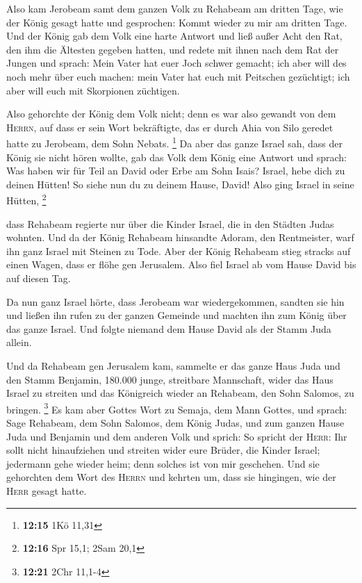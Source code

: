  Also kam Jerobeam samt dem ganzen Volk zu Rehabeam am
dritten Tage, wie der König gesagt hatte und gesprochen: Kommt wieder zu
mir am dritten Tage.  Und der König gab dem Volk eine
harte Antwort und ließ außer Acht den Rat, den ihm die Ältesten gegeben
hatten,  und redete mit ihnen nach dem Rat der Jungen und
sprach: Mein Vater hat euer Joch schwer gemacht; ich aber will des noch
mehr über euch machen: mein Vater hat euch mit Peitschen gezüchtigt; ich
aber will euch mit Skorpionen züchtigen.

 Also gehorchte der König dem Volk nicht; denn es war
also gewandt von dem \textsc{Herrn}, auf dass er sein Wort bekräftigte,
das er durch Ahia von Silo geredet hatte zu Jerobeam, dem Sohn Nebats.
\footnote{\textbf{12:15} 1Kö 11,31}  Da aber das ganze
Israel sah, dass der König sie nicht hören wollte, gab das Volk dem
König eine Antwort und sprach: Was haben wir für Teil an David oder Erbe
am Sohn Isais? Israel, hebe dich zu deinen Hütten! So siehe nun du zu
deinem Hause, David! Also ging Israel in seine Hütten, \footnote{\textbf{12:16}
  Spr 15,1; 2Sam 20,1}

 dass Rehabeam regierte nur über die Kinder Israel, die
in den Städten Judas wohnten.  Und da der König Rehabeam
hinsandte Adoram, den Rentmeister, warf ihn ganz Israel mit Steinen zu
Tode. Aber der König Rehabeam stieg stracks auf einen Wagen, dass er
flöhe gen Jerusalem.  Also fiel Israel ab vom Hause David
bis auf diesen Tag.

 Da nun ganz Israel hörte, dass Jerobeam war
wiedergekommen, sandten sie hin und ließen ihn rufen zu der ganzen
Gemeinde und machten ihn zum König über das ganze Israel. Und folgte
niemand dem Hause David als der Stamm Juda allein.

 Und da Rehabeam gen Jerusalem kam, sammelte er das ganze
Haus Juda und den Stamm Benjamin, 180.000 junge, streitbare Mannschaft,
wider das Haus Israel zu streiten und das Königreich wieder an Rehabeam,
den Sohn Salomos, zu bringen. \footnote{\textbf{12:21} 2Chr 11,1-4}
 Es kam aber Gottes Wort zu Semaja, dem Mann Gottes, und
sprach:  Sage Rehabeam, dem Sohn Salomos, dem König
Judas, und zum ganzen Hause Juda und Benjamin und dem anderen Volk und
sprich:  So spricht der \textsc{Herr}: Ihr sollt nicht
hinaufziehen und streiten wider eure Brüder, die Kinder Israel;
jedermann gehe wieder heim; denn solches ist von mir geschehen. Und sie
gehorchten dem Wort des \textsc{Herrn} und kehrten um, dass sie
hingingen, wie der \textsc{Herr} gesagt hatte.

